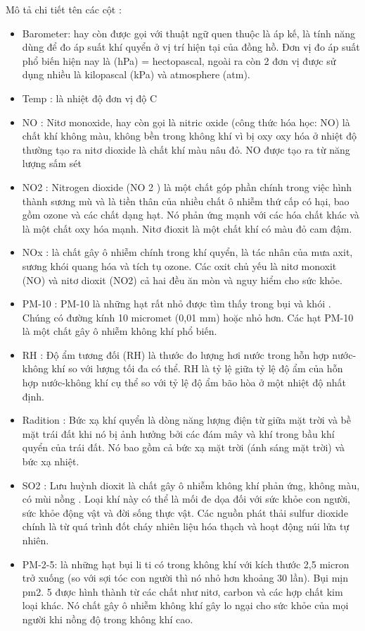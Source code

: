 Mô tả chi tiết tên các cột :
\begin{itemize}
    \item Barometer: hay còn được gọi với thuật ngữ quen thuộc là áp kế, là tính năng dùng để đo áp suất khí quyển ở vị trí hiện tại của đồng hồ. Đơn vị đo áp suất phổ biến hiện nay là (hPa) = hectopascal, ngoài ra còn 2 đơn vị được sử dụng nhiều là kilopascal (kPa) và atmosphere (atm).
    \item Temp : là nhiệt độ đơn vị độ C
    \item NO : Nitơ monoxide, hay còn gọi là nitric oxide (công thức hóa học: NO) là chất khí không màu, không bền trong không khí vì bị oxy oxy hóa ở nhiệt độ thường tạo ra nitơ dioxide là chất khí màu nâu đỏ. NO được tạo ra từ năng lượng sấm sét
    \item NO2 : Nitrogen dioxide (NO 2 ) là một chất góp phần chính trong việc hình thành sương mù và là tiền thân của nhiều chất ô nhiễm thứ cấp có hại, bao gồm ozone và các chất dạng hạt. Nó phản ứng mạnh với các hóa chất khác và là một chất oxy hóa mạnh. Nitơ đioxit là một chất khí có màu đỏ cam đậm.
    \item NOx : là chất gây ô nhiễm chính trong khí quyển, là tác nhân của mưa axit, sương khói quang hóa và tích tụ ozone. Các oxit chủ yếu là nitơ monoxit (NO) và nitơ dioxit (NO2) cả hai đều ăn mòn và nguy hiểm cho sức khỏe.
    \item PM-10 : PM-10 là những hạt rất nhỏ được tìm thấy trong bụi và khói . Chúng có đường kính 10 micromet (0,01 mm) hoặc nhỏ hơn. Các hạt PM-10 là một chất gây ô nhiễm không khí phổ biến.
    \item RH : Độ ẩm tương đối (RH) là thước đo lượng hơi nước trong hỗn hợp nước-không khí so với lượng tối đa có thể. RH là tỷ lệ giữa tỷ lệ độ ẩm của hỗn hợp nước-không khí cụ thể so với tỷ lệ độ ẩm bão hòa ở một nhiệt độ nhất định.
    \item Radition : Bức xạ khí quyển là dòng năng lượng điện từ giữa mặt trời và bề mặt trái đất khi nó bị ảnh hưởng bởi các đám mây và khí trong bầu khí quyển của trái đất. Nó bao gồm cả bức xạ mặt trời (ánh sáng mặt trời) và bức xạ nhiệt.
    \item SO2 : Lưu huỳnh dioxit là chất gây ô nhiễm không khí phản ứng, không màu, có mùi nồng . Loại khí này có thể là mối đe dọa đối với sức khỏe con người, sức khỏe động vật và đời sống thực vật. Các nguồn phát thải sulfur dioxide chính là từ quá trình đốt cháy nhiên liệu hóa thạch và hoạt động núi lửa tự nhiên.
    \item PM-2-5: là những hạt bụi li ti có trong không khí với kích thước 2,5 micron trở xuống (so với sợi tóc con người thì nó nhỏ hơn khoảng 30 lần). Bụi mịn pm2. 5 được hình thành từ các chất như nitơ, carbon và các hợp chất kim loại khác. Nó chất gây ô nhiễm không khí gây lo ngại cho sức khỏe của mọi người khi nồng độ trong không khí cao.

\end{itemize}
